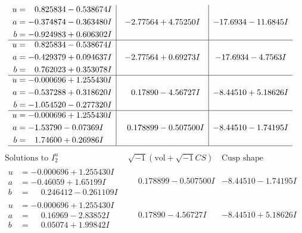 \documentclass[1p]{elsarticle_modified}
\theoremstyle{definition}
\newcommand{\I}{\sqrt{-1}}
\begin{document}
$$\begin{array}{c|c|c}
\begin{aligned}
u &= \phantom{-}0.825834 - 0.538674 I \\
a &= -0.374874 - 0.363480 I \\
b &= -0.924983 + 0.606302 I\end{aligned}
 & -2.77564 + 4.75250 I & -17.6934 - 11.6845 I \\ \hline\begin{aligned}
u &= \phantom{-}0.825834 - 0.538674 I \\
a &= -0.429379 + 0.094637 I \\
b &= \phantom{-}0.762023 + 0.353078 I\end{aligned}
 & -2.77564 + 0.69273 I & -17.6934 - 4.7563 I \\ \hline\begin{aligned}
u &= -0.000696 + 1.255430 I \\
a &= -0.537288 + 0.318620 I \\
b &= -1.054520 - 0.277320 I\end{aligned}
 & \phantom{-}0.17890 - 4.56727 I & -8.44510 + 5.18626 I \\ \hline\begin{aligned}
u &= -0.000696 + 1.255430 I \\
a &= -1.53790 - 0.07369 I \\
b &= \phantom{-}1.74600 + 0.26986 I\end{aligned}
 & \phantom{-}0.178899 - 0.507500 I & -8.44510 - 1.74195 I\\
 \hline 
 \end{array}$$\newpage$$\begin{array}{c|c|c}  
\text{Solutions to }I^u_{2}& \I (\text{vol} + \sqrt{-1}CS) & \text{Cusp shape}\\
 \hline 
\begin{aligned}
u &= -0.000696 + 1.255430 I \\
a &= -0.46059 + 1.65199 I \\
b &= \phantom{-}0.246412 - 0.261109 I\end{aligned}
 & \phantom{-}0.178899 - 0.507500 I & -8.44510 - 1.74195 I \\ \hline\begin{aligned}
u &= -0.000696 + 1.255430 I \\
a &= \phantom{-}0.16969 - 2.83852 I \\
b &= \phantom{-}0.05074 + 1.99842 I\end{aligned}
 & \phantom{-}0.17890 - 4.56727 I & -8.44510 + 5.18626 I \\ \hline\begin{aligned}

\end{aligned}
\end{array}$$
\end{document}
